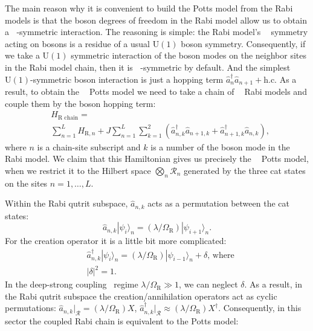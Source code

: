 \documentclass[reprint, aps, prx, amsmath, amssymb, longbibliography, superscriptaddress]{revtex4-2}
\DeclareMathOperator{\Zthree}{\mathbb{Z}_3}
\begin{document}
The main reason why it is convenient to build the Potts model from the Rabi models is that the boson degrees of freedom in the Rabi model allow us to obtain a $\Zthree$-symmetric interaction. The reasoning is simple: the Rabi model's $\Zthree$ symmetry acting on bosons is a residue of a usual $\mathrm{U(1)}$ boson symmetry. Consequently, if we take a $\mathrm{U(1)}$ symmetric interaction of the boson modes on the neighbor sites in the Rabi model chain, then it is $\Zthree$-symmetric by default. And the simplest $\mathrm{U(1)}$-symmetric boson interaction is just a hopping term $\hat a_n^{\dagger} \hat a_{n+1} + \textrm{h.c.}$ As a result, to obtain the $\Zthree$ Potts model we need to take a chain of $\Zthree$ Rabi models and couple them by the boson hopping term:
\begin{equation}
\label{eq:coupled-rabi}
\begin{aligned}
    &H_{\text{R chain}} = \\
    &\sum\limits_{n=1}^L H_{\text{R}, n} + J \sum\limits_{n=1}^L \sum\limits_{k=1}^2\left( \hat a_{n,k}^{\dagger} \hat a_{n+1,k} + \hat a_{n+1,k}^{\dagger} \hat a_{n,k}\right),
\end{aligned}
\end{equation}
where $n$ is a chain-site subscript and $k$ is a number of the boson mode in the $ \Zthree $ Rabi model. We claim that this Hamiltonian gives us precisely the $\Zthree$ Potts model, when we restrict it to the Hilbert space $\bigotimes_n\mathcal{R}_n$ generated by the three cat states on the sites $n=1,\dots,L$.

Within the Rabi qutrit subspace,  $\hat a_{n,k}$ acts as a permutation between the cat states:
\begin{equation}
    \hat a_{n,k} |\psi_i\rangle_n = (\lambda/\Omega_{\textrm{R}})|\psi_{i+1}\rangle_n. 
\end{equation}
For the creation operator it is a little bit more complicated:
\begin{equation}
\begin{aligned}
    &\hat a_{n,k}^{\dagger} |\psi_i\rangle_n =  (\lambda/\Omega_{\textrm{R}})|\psi_{i-1}\rangle_n + \delta, \,\text{where} \\
    &|\delta|^2 = 1.
\end{aligned}
\end{equation}
In the deep-strong coupling~\cite{kozin_cavityenhanced_2025,kozin_schottky_2025} regime $\lambda/\Omega_{\text{R}} \gg 1$, we can neglect $\delta$. As a result, in the Rabi qutrit subspace the creation/annihilation operators act as cyclic permutations: $\hat a_{n,k}|_{\mathcal{R}} = (\lambda/\Omega_{\textrm{R}}) X$, $\hat a_{n,k}^{\dagger}|_{\mathcal{R}} \approx (\lambda/\Omega_{\textrm{R}}) X^{\dagger}$. Consequently, in this sector the coupled Rabi chain is equivalent to the Potts model:
\end{document}
